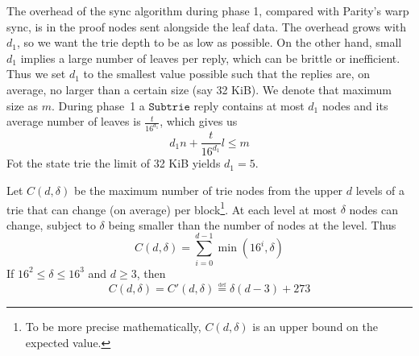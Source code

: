 \documentclass{amsart}
\begin{document}
The overhead of the sync algorithm during phase 1, compared with Parity's warp sync, is in the proof nodes sent alongside the leaf data.
The overhead grows with $d_1$, so we want the trie depth to be as low as possible.
On the other hand, small $d_1$ implies a large number of leaves per reply, which can be brittle or inefficient.
Thus we set $d_1$ to the smallest value possible such that the replies are, on average, no larger than a certain size (say 32 KiB).
We denote that maximum size as $m$.
During phase~1 a $\texttt{Subtrie}$ reply contains at most $d_1$ nodes
and its average number of leaves is $\frac{t}{16^{d_1}}$,
which gives us
\begin{equation}
    d_1 n + \frac{t}{16^{d_1}} l \leq m
\end{equation}
Fot the state trie the limit of 32 KiB yields $d_1 = 5$.

Let $C(d, \delta)$ be the maximum number of trie nodes from the upper $d$ levels of a trie that can change (on average) per block\footnote{To
be more precise mathematically, $C(d, \delta)$ is an upper bound on the expected value.}.
At each level at most $\delta$ nodes can change, subject to $\delta$ being smaller than the number of nodes at the level.
Thus
\begin{equation}
    C(d, \delta) = \sum_{i=0}^{d-1} \min(16^i, \delta)
\end{equation}
If $16^2 \leq \delta \leq 16^3$ and $d \geq 3$, then
\begin{equation}
    C(d, \delta) = C'(d, \delta) \overset{\underset{\mathrm{def}}{}}{=}
     \delta (d-3) + 273
\end{equation}
\end{document}
